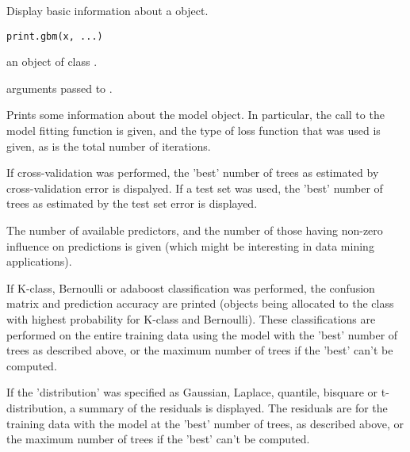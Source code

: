 \begin{Description}\relax
Display basic information about a  object.
\end{Description}
\begin{Usage}
\begin{verbatim}
print.gbm(x, ...)
\end{verbatim}
\end{Usage}
\begin{Arguments}
\begin{ldescription}
\item[\code{x}] an object of class . 
\item[\code{...}] arguments passed to . 
\end{ldescription}
\end{Arguments}
\begin{Details}\relax
Prints some information about the model object. In particular, the call
to the model fitting function is given, and the type of loss function
that was used is given, as is the total number of iterations.

If cross-validation was performed, the 'best' number of trees as
estimated
by cross-validation error is
dispalyed. If a test set was used, the 'best' number
of trees as estimated by the test set error is displayed.

The number of available predictors, and the number of those having
non-zero influence on predictions is given (which might be interesting
in data mining applications).

If K-class, Bernoulli or adaboost classification was performed,
the confusion matrix and prediction accuracy are printed (objects
being allocated to the class with highest probability for K-class
and Bernoulli). These classifications are performed on the entire
training
data using the model with the 'best' number of trees as described
above, or the maximum number of trees if the 'best' can't be
computed.

If the 'distribution' was specified as Gaussian, Laplace, quantile,
bisquare or t-distribution, a summary of the residuals is displayed.
The residuals are for the training data with the model at the 'best' number of trees, as
described above, or the maximum number of trees if the 'best' can't
be computed.
\end{Details}
